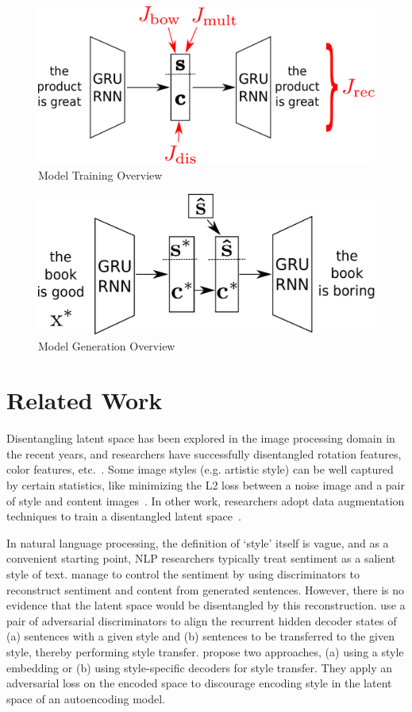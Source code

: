 \documentclass[11pt,a4paper]{article}
\begin{document}
\begin{figure}[ht]
	\centering
	\includegraphics[width=0.8\linewidth]{model-overview-training}
	\caption{Model Training Overview}
	\label{fig:model-training-overview}
\end{figure}
\begin{figure}[ht]
	\centering
	\includegraphics[width=0.8\linewidth]{model-overview-inference}
	\caption{Model Generation Overview}
	\label{fig:model-inference-overview}
\end{figure}


\section{Related Work}

Disentangling latent space has been explored in the image processing domain in the recent years, and researchers have successfully disentangled rotation features, color features, etc.~\cite{chen2016infogan,luan2017deep}. Some image styles (e.g. artistic style) can be well captured by certain statistics, like minimizing the L2 loss between a noise image and a pair of style and content images~\cite{gatys2016image}. In other work, researchers adopt data augmentation techniques to train a disentangled latent space~\cite{kulkarni2015deep,champandard2016semantic}.

In natural language processing, the definition of `style' itself is vague, and as a convenient starting point, NLP researchers typically treat sentiment as a salient style of text. \citet{hu2017toward} manage to control the sentiment by using discriminators to reconstruct sentiment and content from generated sentences. However, there is no evidence that the latent space would be disentangled by this reconstruction. \citet{shen2017style} use a pair of adversarial discriminators to align the recurrent hidden decoder states of (a) sentences with a given style and (b) sentences to be transferred to the given style, thereby performing style transfer. \citet{fu2017style} propose two approaches, (a) using a style embedding or (b) using style-specific decoders for style transfer. They apply an adversarial loss on the encoded space to discourage encoding style in the latent space of an autoencoding model.
\end{document}
